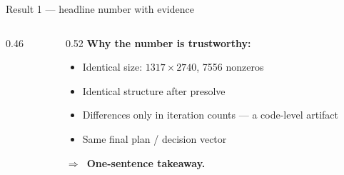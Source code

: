 \documentclass[aspectratio=169,11pt]{beamer}   %
\begin{document}
\begin{frame}{Result 1 --- headline number with evidence}
\begin{columns}[T]
\begin{column}{0.46\textwidth}
\centering
{}
\end{column}
\begin{column}{0.52\textwidth}
\footnotesize
\textcolor{secondary}{\bfseries Why the number is trustworthy:}
\begin{itemize}\setlength\itemsep{0.6mm}
\item Identical size: $1317\times 2740$, 7556 nonzeros
\item Identical structure after presolve
\item Differences only in iteration counts --- a code-level artifact
\item Same final plan / decision vector
\end{itemize}
\vspace{1mm}
{\color{accent}\bfseries $\Rightarrow$\ One-sentence takeaway.}
\end{column}
\end{columns}
\end{frame}
\end{document}
